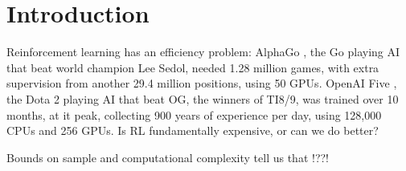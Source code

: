 \chapter{Introduction}\label{C:intro}

Reinforcement learning has an efficiency problem: AlphaGo \cite{Silver2016a}, the Go
playing AI that beat world champion Lee Sedol, needed 1.28 million games, with
extra supervision from another 29.4 million positions, using 50 GPUs.
OpenAI Five \cite{OpenAI2018}, the Dota 2 playing AI that beat OG, the winners of TI8/9, was
trained over 10 months, at it peak, collecting 900 years of experience per day, using
128,000 CPUs and 256 GPUs. Is RL fundamentally expensive, or can we do better?

Bounds on sample and computational complexity tell us that !??!

